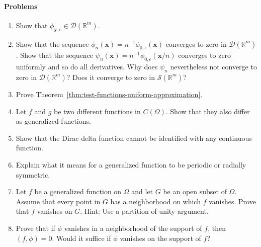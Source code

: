 \paragraph*{Problems}

\begin{enumerate}[label=\thesection.\arabic*.,ref=\thesection.\arabic*,start=1,series=book-problems]

\item\label{ex:bump-is-test-function} Show that $\phi_{\bm{y},\epsilon}\in\mathcal{D}(\mathbb{R}^m)$.

\item\label{ex:test-function-support-escape} Show that the sequence $\phi_n(\bm{x})=n^{-1}\phi_{0,\epsilon}(\bm{x})$ converges to zero in $\mathcal{D}(\mathbb{R}^m)$. Show that the sequence $\psi_n(\bm{x})=n^{-1}\phi_{0,\epsilon}(\bm{x}/n)$ converges to zero uniformly and so do all derivatives. Why does $\psi_n$ nevertheless not converge to zero in $\mathcal{D}(\mathbb{R}^m)$? Does it converge to zero in $\mathcal{S}(\mathbb{R}^m)$?

\item\label{ex:prove-test-function-uniform-approximation} Prove Theorem~\ref{thm:test-functions-uniform-approximation}.

\item\label{ex:regular-distributions-injective} Let $f$ and $g$ be two different functions in $C(\Omega)$. Show that they also differ as generalized functions.

\item\label{ex:delta-not-continuous-function} Show that the Dirac delta function cannot be identified with any continuous function.

\item\label{ex:distribution-periodicity-radial-symmetry} Explain what it means for a generalized function to be periodic or radially symmetric.

\item\label{ex:distribution-local-vanishing} Let $f$ be a generalized function on $\Omega$ and let $G$ be an open subset of $\Omega$. Assume that every point in $G$ has a neighborhood on which $f$ vanishes. Prove that $f$ vanishes on $G$. Hint: Use a partition of unity argument.

\item\label{ex:pairing-away-from-distribution-support} Prove that if $\phi$ vanishes in a neighborhood of the support of $f$, then $(f,\phi)=0$. Would it suffice if $\phi$ vanishes on the support of $f$?


\end{enumerate}

